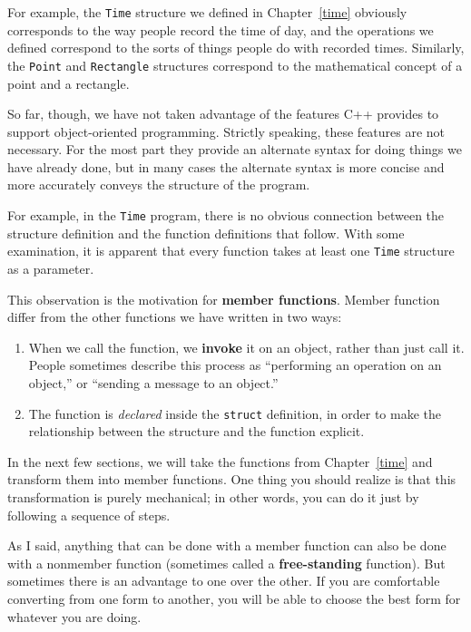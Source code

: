 For example, the {\tt Time} structure we defined in Chapter~\ref{time}
obviously corresponds to the way people record the time of day,
and the operations we defined correspond to the sorts of things
people do with recorded times.  Similarly, the {\tt Point} and
{\tt Rectangle} structures correspond to the mathematical concept
of a point and a rectangle.

So far, though, we have not taken advantage of the features C++
provides to support object-oriented programming.  Strictly speaking,
these features are not necessary.  For the most part they provide
an alternate syntax for doing things we have already done, but
in many cases the alternate syntax is more concise and more
accurately conveys the structure of the program.

For example, in the {\tt Time} program, there is
no obvious connection between the structure definition and the
function definitions that follow.  With some examination, it
is apparent that every function takes at least one {\tt Time}
structure as a parameter.

This observation is the motivation for {\bf member functions}.
Member function differ from the other functions we have written
in two ways:

\begin{enumerate}

\item When we call the function, we {\bf invoke} it on an
object, rather than just call it.  People sometimes describe
this process as ``performing an operation on an object,'' or
``sending a message to an object.''

\item The function is {\em declared} inside the {\tt struct}
definition, in order to make the relationship between the
structure and the function explicit.

\end{enumerate}

In the next few sections, we will take the functions from
Chapter~\ref{time} and transform them into member functions.
One thing you should realize is that this transformation is
purely mechanical; in other words, you can do it just by following
a sequence of steps.


As I said, anything that can be done with a member function can
also be done with a nonmember function (sometimes called a
{\bf free-standing} function).   But sometimes there is an
advantage to one over the other.  If you are comfortable converting
from one form to another, you will be able to choose the best
form for whatever you are doing.

